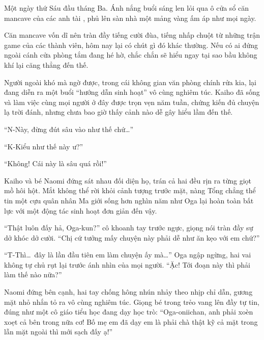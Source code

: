 \documentclass[../main.tex]{subfiles}
\begin{document}

Một ngày thứ Sáu đầu tháng Ba. Ánh nắng buổi sáng len lỏi qua ô cửa sổ căn mancave của các anh tài \hls, phủ lên sàn nhà một mảng vàng ấm áp như mọi ngày.

Căn mancave vốn dĩ nên tràn đầy tiếng cười đùa, tiếng nhấp chuột từ những trận game của các thành viên, hôm nay lại có chút gì đó khác thường. Nếu có ai đứng ngoài cánh cửa phòng tắm đang hé hờ, chắc chắn sẽ hiểu ngay tại sao bầu không khí lại căng thẳng đến thế.

Người ngoài khó mà ngờ được, trong cái không gian văn phòng chính rửa kia, lại đang diễn ra một buổi ``hướng dẫn sinh hoạt'' vô cùng nghiêm túc. Kaiho đã sống và làm việc cùng mọi người ở đây được trọn vẹn năm tuần, chứng kiến đủ chuyện lạ trời đánh, nhưng chưa bao giờ thấy cảnh nào dễ gây hiểu lầm đến thế.

``N-Này, đừng đút sâu vào như thế chứ\dots''

``K-Kiểu như thế này ư?''

``Không! Cái này là sâu quá rồi!''

Kaiho và bé Naomi đứng sát nhau đối diện họ, trán cả hai đều rịn ra từng giọt mồ hôi hột. Mắt không thể rời khỏi cảnh tượng trước mặt, nàng Tổng chẳng thể tin một cựu quân nhân Ma giới sống hơn nghìn năm như Oga lại hoàn toàn bất lực với một động tác sinh hoạt đơn giản đến vậy.

``Thật luôn đấy hả, Oga-kun?'' cô khoanh tay trước ngực, giọng nói tràn đầy sự dở khóc dở cười. ``Chị cứ tưởng mấy chuyện này phải dễ như ăn kẹo với em chứ?''

``T-Thì\dots\ đây là lần đầu tiên em làm chuyện ấy mà\dots'' Oga ngập ngừng, hai vai không tự chủ rụt lại trước ánh nhìn của mọi người. ``Ặc! Tới đoạn này thì phải làm thế nào nữa?''

Naomi đứng bên cạnh, hai tay chống hông nhún nhảy theo nhịp chỉ dẫn, gương mặt nhỏ nhắn tỏ ra vô cùng nghiêm túc. Giọng bé trong trẻo vang lên đầy tự tin, đúng như một cô giáo tiểu học đang dạy học trò: ``Oga-oniichan, anh phải xoèn xoẹt cả bên trong nữa cơ! Bố mẹ em đã dạy em là phải chà thật kỹ cả mặt trong lẫn mặt ngoài thì mới sạch đấy ạ!''
\end{document}
